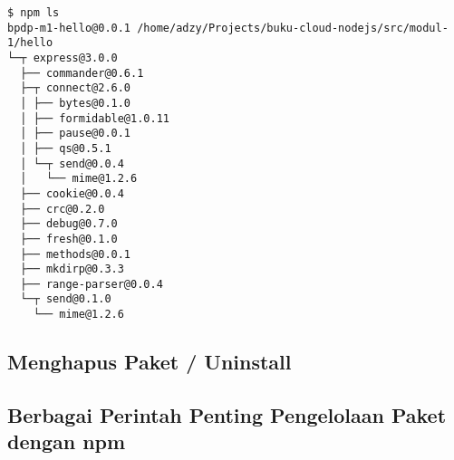 \lstset{language=bash,caption=Hasil instalasi Flatiron}
\begin{lstlisting}
$ npm ls
bpdp-m1-hello@0.0.1 /home/adzy/Projects/buku-cloud-nodejs/src/modul-1/hello
└─┬ express@3.0.0 
  ├── commander@0.6.1 
  ├─┬ connect@2.6.0 
  │ ├── bytes@0.1.0 
  │ ├── formidable@1.0.11 
  │ ├── pause@0.0.1 
  │ ├── qs@0.5.1 
  │ └─┬ send@0.0.4 
  │   └── mime@1.2.6 
  ├── cookie@0.0.4 
  ├── crc@0.2.0 
  ├── debug@0.7.0 
  ├── fresh@0.1.0 
  ├── methods@0.0.1 
  ├── mkdirp@0.3.3 
  ├── range-parser@0.0.4 
  └─┬ send@0.1.0 
    └── mime@1.2.6 
\end{lstlisting}

\subsection{Menghapus Paket / Uninstall}

\subsection{Berbagai Perintah Penting Pengelolaan Paket dengan npm}

